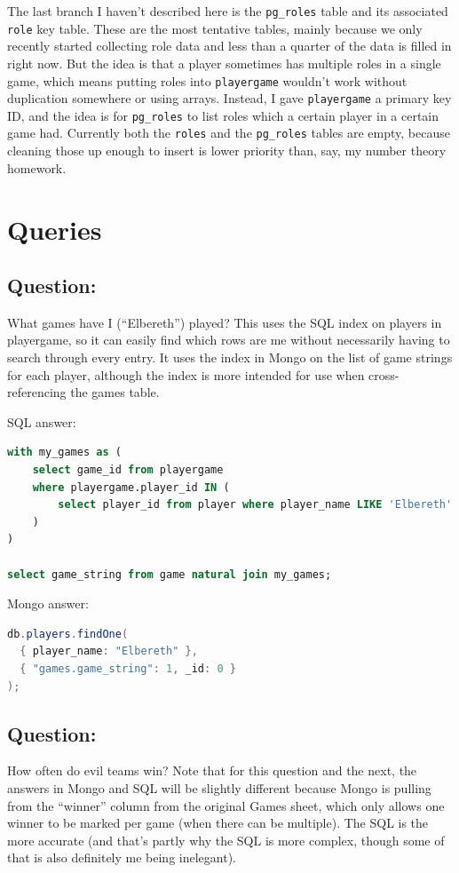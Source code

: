 \documentclass[11pt, oneside]{amsart}   	%
\begin{document}
The last branch I haven't described here is the \texttt{pg\_roles} table and its associated \texttt{role} key table. These are the most tentative tables, mainly because we only recently started collecting role data and less than a quarter of the data is filled in right now. But the idea is that a player sometimes has multiple roles in a single game, which means putting roles into \texttt{playergame} wouldn't work without duplication somewhere or using arrays. Instead, I gave \texttt{playergame} a primary key ID, and the idea is for \texttt{pg\_roles} to list roles which a certain player in a certain game had. Currently both the \texttt{roles} and the \texttt{pg\_roles} tables are empty, because cleaning those up enough to insert is lower priority than, say, my number theory homework. 


\section{Queries}

\subsection{Question:} What games have I (``Elbereth'') played? 
This uses the SQL index on players in playergame, so it can easily find which rows are me without necessarily having to search through every entry. It uses the index in Mongo on the list of game strings for each player, although the index is more intended for use when cross-referencing the games table. 

SQL answer: 
\begin{lstlisting}[language=SQL]
with my_games as (
    select game_id from playergame 
    where playergame.player_id IN (
        select player_id from player where player_name LIKE 'Elbereth'
    )
)
    
select game_string from game natural join my_games;
\end{lstlisting}
    
Mongo answer:
\begin{lstlisting}[language=java]
db.players.findOne(
  { player_name: "Elbereth" },
  { "games.game_string": 1, _id: 0 }
);
\end{lstlisting}

\subsection{Question:} How often do evil teams win? 
Note that for this question and the next, the answers in Mongo and SQL will be slightly different because Mongo is pulling from the ``winner'' column from the original Games sheet, which only allows one winner to be marked per game (when there can be multiple). The SQL is the more accurate (and that's partly why the SQL is more complex, though some of that is also definitely me being inelegant). 
\end{document}
